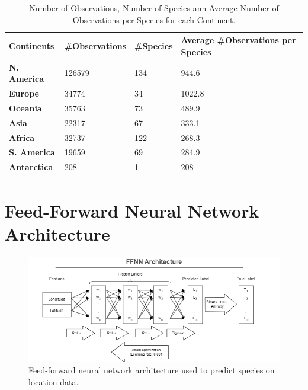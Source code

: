 \begin{table}[H]
\begin{tabular}{ |p{3cm}||p{3cm}|p{3cm}|p{3cm}|  }
 \hline
 \rowcolor{lightgray} \footnotesize{\textbf{Continents}}& \footnotesize{\textbf{\#Observations}} & \footnotesize{\textbf{\#Species}} & \footnotesize{\textbf{Average \#Observations per Species}}\\
 \hline
 \footnotesize{\textbf{N. America}}   & \footnotesize{126579}    & \footnotesize{134} &   \footnotesize{944.6}\\
 \footnotesize{\textbf{Europe}}   & \footnotesize{34774}    & \footnotesize{34} &   \footnotesize{1022.8}\\
 \footnotesize{\textbf{Oceania}}   & \footnotesize{35763}    & \footnotesize{73} &   \footnotesize{489.9}\\
 \footnotesize{\textbf{Asia}}   & \footnotesize{22317}    & \footnotesize{67} &   \footnotesize{333.1}\\
 \footnotesize{\textbf{Africa}}   & \footnotesize{32737}    & \footnotesize{122} &   \footnotesize{268.3}\\
 \footnotesize{\textbf{S. America}}   & \footnotesize{19659}    & \footnotesize{69} &   \footnotesize{284.9}\\
 \footnotesize{\textbf{Antarctica}}   & \footnotesize{208}    & \footnotesize{1} &   \footnotesize{208}\\
 \hline
\end{tabular}
\caption{Number of Observations, Number of Species ann Average Number of Observations per Species for each Continent.}

\end{table}


\section{Feed-Forward Neural Network Architecture} \label{appendix:ffnn}
\begin{figure}[h]
\centering
\includegraphics[width = .6\textwidth]{Images/neural_net.png}
\caption{Feed-forward neural network architecture used to predict species on location data.}
\label{FFNNarchitecture}
\end{figure}



